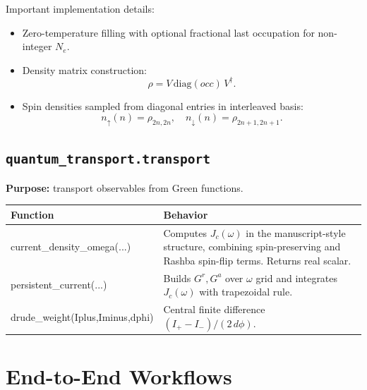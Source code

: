 \documentclass[11pt,a4paper]{article}
\begin{document}
Important implementation details:
\begin{itemize}[leftmargin=1.5em]
  \item Zero-temperature filling with optional fractional last occupation for non-integer \(N_e\).
  \item Density matrix construction:
  \[
  \rho = V \,\mathrm{diag}(occ)\, V^\dagger.
  \]
  \item Spin densities sampled from diagonal entries in interleaved basis:
  \[
  n_{\uparrow}(n)=\rho_{2n,2n},\quad n_{\downarrow}(n)=\rho_{2n+1,2n+1}.
  \]
\end{itemize}

\subsection{\texttt{quantum\_transport.transport}}
\textbf{Purpose:} transport observables from Green functions.

\begin{longtable}{>{\ttfamily}p{} p{}}
\toprule
Function & Behavior \\
\midrule
\endhead
current\_density\_omega(...) & Computes \(J_c(\omega)\) in the manuscript-style structure, combining spin-preserving and Rashba spin-flip terms. Returns real scalar. \\
persistent\_current(...) & Builds \(G^r,G^a\) over \(\omega\) grid and integrates \(J_c(\omega)\) with trapezoidal rule. \\
drude\_weight(Iplus,Iminus,dphi) & Central finite difference \((I_+-I_-)/(2\,d\phi)\). \\
\bottomrule
\end{longtable}

\section{End-to-End Workflows}
\end{document}
